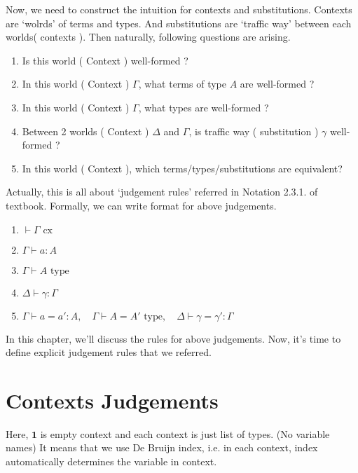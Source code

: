 \documentclass[12pt, a4paper, openany, twoside]{book}
\theoremstyle{definition}
\theoremstyle{remark}
\theoremstyle{plain}
\numberwithin{equation}{section}
\begin{document}
Now, we need to construct the intuition for contexts and substitutions. Contexts are \lq wolrds' of terms and types. 
And substitutions are \lq traffic way' between each worlds( contexts ). Then naturally, following questions are arising. 
\begin{tcolorbox}[colback=yellow!10!white,colframe=red!75!black,title=Questions]
    \begin{enumerate}
        \item Is this world ( Context ) well-formed ?
        \item In this world ( Context ) $\Gamma$, what terms of type $A$ are well-formed ? 
        \item In this world ( Context ) $\Gamma$, what types are well-formed ? 
        \item Between 2 worlds ( Context ) $\Delta$ and $\Gamma$, is traffic way ( substitution ) $\gamma$ well-formed ?
        \item In this world ( Context ), which terms/types/substitutions are equivalent? 
    \end{enumerate}
\end{tcolorbox}

Actually, this is all about \lq judgement rules' referred in Notation 2.3.1. of textbook. 
Formally, we can write format for above judgements. 

\begin{tcolorbox}[colback=yellow!10!white,colframe=red!75!black,title=Formal Representations for Judgements]
    \begin{enumerate}
        \item $\vdash \Gamma \text{ cx}$
        \item $\Gamma \vdash a : A$
        \item $\Gamma \vdash A \text{ type}$
        \item $\Delta \vdash \gamma : \Gamma$
        \item $\Gamma \vdash a = a' : A, \quad \Gamma \vdash A = A' \text{ type}, \quad \Delta \vdash \gamma = \gamma' : \Gamma$ 
    \end{enumerate}
\end{tcolorbox}

In this chapter, we'll discuss the rules for above judgements. 
Now, it's time to define explicit judgement rules that we referred. 
\newpage
\section{Contexts Judgements}
\begin{tcolorbox}[colback=yellow!10!white,colframe=green!75!black,title=Construction 1.2.1.]\label{cx judgement}
\end{tcolorbox}
Here, $\mathbf{1}$ is empty context and each context is just list of types. (No variable names) It means that 
we use De Bruijn index, i.e. in each context, index automatically determines the variable in context. 
\end{document}
